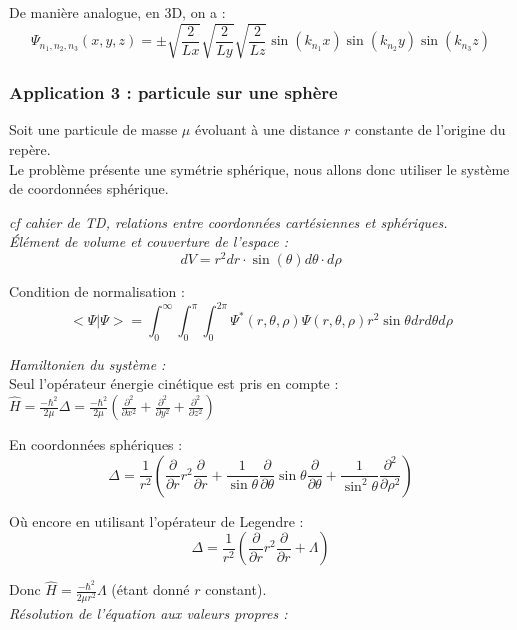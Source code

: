 \documentclass[../main.tex]{subfile}
\begin{document}
     De manière analogue, en 3D, on a :
     $$\Psi_{n_1, n_2, n_3}(x, y, z) = \pm \sqrt{\frac{2}{Lx}} \sqrt{\frac{2}{Ly}} \sqrt{\frac{2}{Lz}}\sin(k_{n_1}x) \sin(k_{n_2}y) \sin(k_{n_3} z)$$
   
   \subsubsection{Application 3 : particule sur une sphère}

   Soit une particule de masse $\mu$ évoluant à une distance $r$ constante de l'origine du repère.\\

   Le problème présente une symétrie sphérique, nous allons donc utiliser le système de coordonnées sphérique.\\

  \begin{rema} 
      \it{cf} cahier de TD, relations entre coordonnées cartésiennes et sphériques.\\

      Élément de volume et couverture de l'espace :
      $$dV = r^2dr \cdot \sin(\theta) d\theta \cdot d\rho$$

      Condition de normalisation :
      $$<\Psi | \Psi> = \int_0^\infty \int_0^\pi \int_0^{2\pi} \Psi^*(r, \theta, \rho) \Psi(r, \theta, \rho) r^2 \sin\theta dr d\theta d\rho$$
  \end{rema}

  \emph{Hamiltonien du système :}\\
  Seul l'opérateur énergie cinétique est pris en compte : $\hat{H} = \frac{-\hbar^2}{2\mu}\Delta = \frac{-\hbar^2}{2\mu} (\frac{\partial^2}{\partial x^2} + \frac{\partial^2}{\partial y^2} + \frac{\partial^2}{\partial z^2})$

  En coordonnées sphériques :
  $$\Delta = \frac{1}{r^2} (\frac{\partial}{\partial r} r^2 \frac{\partial}{\partial r} + \frac{1}{\sin \theta} \frac{\partial}{\partial \theta} \sin \theta \frac{\partial}{\partial \theta} + \frac{1}{\sin^2\theta}\frac{\partial^2}{\partial \rho^2})$$

  Où encore en utilisant l'opérateur de Legendre :
  $$\Delta = \frac{1}{r^2}(\frac{\partial}{\partial r} r^2 \frac{\partial}{\partial r} + \Lambda)$$

  Donc $\hat{H} = \frac{-\hbar^2}{2\mu r^2} \Lambda$ (étant donné $r$ constant).\\



  \emph{Résolution de l'équation aux valeurs propres :}\\
\end{document}
